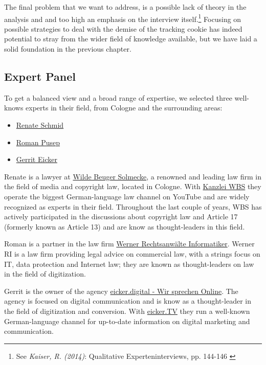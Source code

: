 The final problem that we want to address, is a possible lack of theory in the analysis and and too high an emphasis on the interview itself.\footnote{See \textit{Kaiser, R. (2014)}: Qualitative Experteninterviews, pp. 144-146 \cite{expertInterviews}} Focusing on possible strategies to deal with the demise of the tracking cookie has indeed potential to stray from the wider field of knowledge available, but we have laid a solid foundation in the previous chapter.

\subsection{Expert Panel}

To get a balanced view and a broad range of expertise, we selected three well-knows experts in their field, from Cologne and the surrounding areas:

\begin{itemize}
 \item \href{https://www.linkedin.com/in/renate-schmid-535233113/}{Renate Schmid}
 \item \href{https://www.linkedin.com/in/roman-pusep-36b33374/}{Roman Pusep}
 \item \href{https://www.linkedin.com/in/eicker/}{Gerrit Eicker}
\end{itemize}

Renate is a lawyer at \href{https://www.wbs-law.de/}{Wilde Beuger Solmecke}, a renowned and leading law firm in the field of media and copyright law, located in Cologne. With \href{https://www.youtube.com/user/KanzleiWBS}{Kanzlei WBS} they operate the biggest German-language law channel on YouTube and are widely recognized as experts in their field. Throughout the last couple of years, WBS has actively participated in the discussions about copyright law and Article 17 (formerly known as Article 13) and are know as thought-leaders in this field.

Roman is a partner in the law firm \href{https://www.werner-ri.de/}{Werner Rechtsanwälte Informatiker}. Werner RI is a law firm providing legal advice on commercial law, with a strings focus on IT, data protection and Internet law; they are known as thought-leaders on law in the field of digitization.

Gerrit is the owner of the agency \href{https://eicker.digital/}{eicker.digital - Wir sprechen Online}. The agency is focused on digital communication and is know as a thought-leader in the field of digitization and conversion. With \href{https://www.youtube.com/eickertv}{eicker.TV} they run a well-known German-language channel for up-to-date information on digital marketing and communication.

